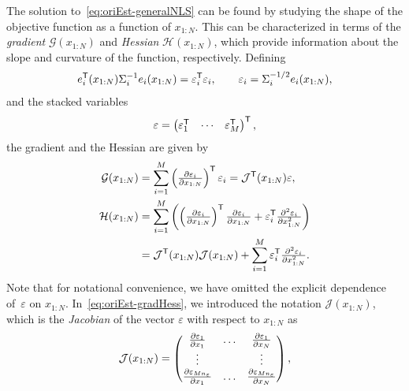 The solution to~\eqref{eq:oriEst-generalNLS} can be found by studying the shape of the objective function as a function of $x_{1:N}$. This can be characterized in terms of the \textit{gradient} $\mathcal{G}(x_{1:N})$ and \textit{Hessian} $\mathcal{H}(x_{1:N})$, which provide information about the slope and curvature of the function, respectively. Defining 
\begin{align*}
e^{\mathsf{T}}_i(x_{1:N}) \Sigma_i^{-1} e_i(x_{1:N}) = \varepsilon_i^{\mathsf{T}} \varepsilon_i, \qquad \varepsilon_i = \Sigma_i^{-1/2} e_i(x_{1:N}),
\end{align*}
and the stacked variables 
\begin{align*}
\varepsilon = \begin{pmatrix} \varepsilon_1^{\mathsf{T}} & \cdots & \varepsilon^{\mathsf{T}}_M \end{pmatrix}^{\mathsf{T}},
\end{align*}
the gradient and the Hessian are given by
\begin{subequations}
\label{eq:oriEst-gradHess}
\begin{align}
\mathcal{G}(x_{1:N}) &= \sum_{i = 1}^{M} \left( \tfrac{\partial \varepsilon_i}{\partial x_{1:N}} \right)^{\mathsf{T}} \varepsilon_i= \mathcal{J}^{\mathsf{T}}(x_{1:N}) \varepsilon, \label{eq:oriEst-gradient} \\
\mathcal{H}(x_{1:N}) &= \sum_{i = 1}^{M} \left( \left( \tfrac{\partial \varepsilon_i}{\partial x_{1:N}} \right)^{\mathsf{T}} \tfrac{\partial \varepsilon_i}{\partial x_{1:N}} + \varepsilon_i^{\mathsf{T}} \tfrac{\partial^2 \varepsilon_i}{\partial x_{1:N}^2} \right) \nonumber \\
&= \mathcal{J}^{\mathsf{T}}(x_{1:N}) \mathcal{J}(x_{1:N}) + \sum_{i = 1}^{M} \varepsilon_i^{\mathsf{T}} \tfrac{\partial^2 \varepsilon_i}{\partial x_{1:N}^2}. \label{eq:oriEst-hessian}
\end{align}
\end{subequations}
Note that for notational convenience, we have omitted the explicit dependence of~$\varepsilon$ on $x_{1:N}$. In~\eqref{eq:oriEst-gradHess}, we introduced the notation $\mathcal{J}(x_{1:N})$, which is the \emph{Jacobian} of the vector $\varepsilon$ with respect to $x_{1:N}$ as
\begin{align}
\mathcal{J}(x_{1:N}) = \begin{pmatrix} \tfrac{\partial \varepsilon_1}{\partial x_1} & \hdots & \tfrac{\partial \varepsilon_1}{\partial x_N} \\
\vdots & & \vdots \\
\tfrac{\partial \varepsilon_{M n_\varepsilon}}{\partial x_1} & \hdots & \tfrac{\partial \varepsilon_{ M n_\varepsilon}}{\partial x_N}
\end{pmatrix},
\end{align}
